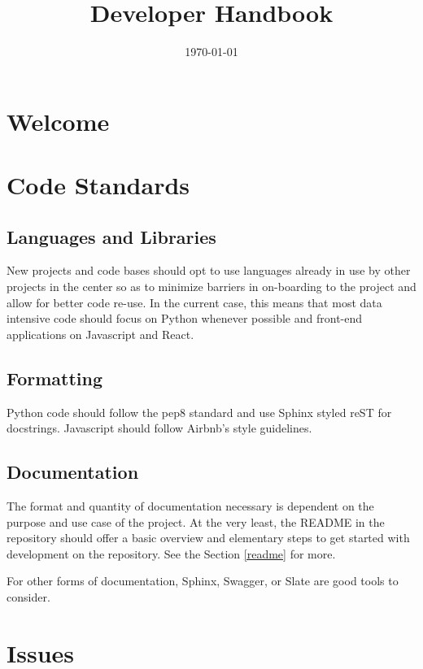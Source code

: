\documentclass[a4paper,12pt,titlepage]{scrartcl}
\title{Developer Handbook}
\date{\today}
\begin{document}
	\maketitle
	
	\tableofcontents
	\newpage
   
	\section{Welcome}
	
	\section{Code Standards}
	
	\subsection{Languages and Libraries}
	
	New projects and code bases should opt to use languages already in use by other projects in the center so as to minimize barriers in on-boarding to the project and allow for better code re-use.
	In the current case, this means that most data intensive code should focus on Python whenever possible and front-end applications on Javascript and React. 
	
	\subsection{Formatting}
	
	Python code should follow the pep8 standard\cite{pep8} and use Sphinx styled reST\cite{sphinx} for docstrings.
	Javascript should follow Airbnb's style guidelines\cite{airbnbjs}.
   	
   	\subsection{Documentation}
   	
   	The format and quantity of documentation necessary is dependent on the purpose and use case of the project.
   	At the very least, the README in the repository should offer a basic overview and elementary steps to get started with development on the repository.
   	See the Section \ref{readme}  for more.
   	
   	For other forms of documentation, Sphinx\cite{sphinxdocs}, Swagger\cite{swagger}, or Slate\cite{slate} are good tools to consider.
   	
   
 	\section{Issues}
 	
\end{document}
